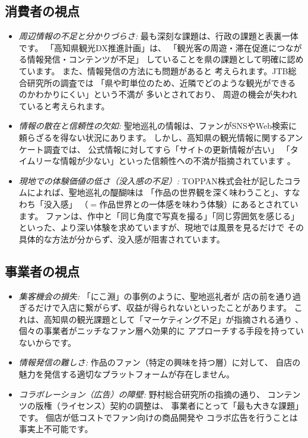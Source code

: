 \documentclass{docs}
\begin{document}
\subsection{消費者の視点}
\begin{itemize}
	\item \emph{周辺情報の不足と分かりづらさ:}
    最も深刻な課題は、行政の課題\cite{kochi_dx_plan}と表裏一体です。
    「高知県観光DX推進計画」\cite{kochi_dx_plan}は、
    「観光客の周遊・滞在促進につながる情報発信・コンテンツが不足」
    していることを県の課題として明確に認めています。
	また、情報発信の方法にも問題があると
	考えられます。JTB総合研究所の調査\cite{jtb_trc_2017}では
	「県や町単位のため、近隣でどのような観光ができるのかわかりにくい」という不満が
	多いとされており、
	周遊の機会が失われていると考えられます。

    \item \emph{情報の散在と信頼性の欠如:}
    聖地巡礼の情報は、ファンがSNSやWeb検索に頼らざるを得ない状況にあります。
    しかし、高知県の観光情報に関するアンケート調査では、
    公式情報に対してすら「サイトの更新情報が古い」
    「タイムリーな情報が少ない」といった信頼性への不満が指摘されています
    \cite{kochi_tech_2017}。

    \item \emph{現地での体験価値の低さ（没入感の不足）:}
    TOPPAN株式会社が記したコラム\cite{toppan2025}によれば、聖地巡礼の醍醐味は
    「作品の世界観を深く味わうこと」、すなわち「没入感」
	（$={}$作品世界との一体感を味わう体験）にあるとされています。
    ファンは、作中と「同じ角度で写真を撮る」「同じ雰囲気を感じる」
    といった、より深い体験を求めていますが、現地では風景を見るだけで
    その具体的な方法が分からず、没入感が阻害されています。
\end{itemize}


\subsection{事業者の視点}
\begin{itemize}
\item \emph{集客機会の損失:}
    「にこ淵」の事例\cite{nikobuchi_mlit}のように、聖地巡礼者が
    店の前を通り過ぎるだけで入店に繋がらず、収益が得られないといったことがあります。
    これは、高知県の観光課題として「マーケティング不足」が指摘される通り
    \cite{kochi_tech_2017}、
    個々の事業者がニッチなファン層へ効果的に
    アプローチする手段を持っていないからです。

    \item \emph{情報発信の難しさ:}
    作品のファン（特定の興味を持つ層）に対して、
    自店の魅力を発信する適切なプラットフォームが存在しません。

    \item \emph{コラボレーション（広告）の障壁:}
    野村総合研究所の指摘\cite{nri2024}の通り、
    コンテンツの版権（ライセンス）契約の調整は、
    事業者にとって「最も大きな課題」です。
    個店が低コストでファン向けの商品開発や
    コラボ広告を行うことは事実上不可能です。
\end{itemize}
\end{document}
